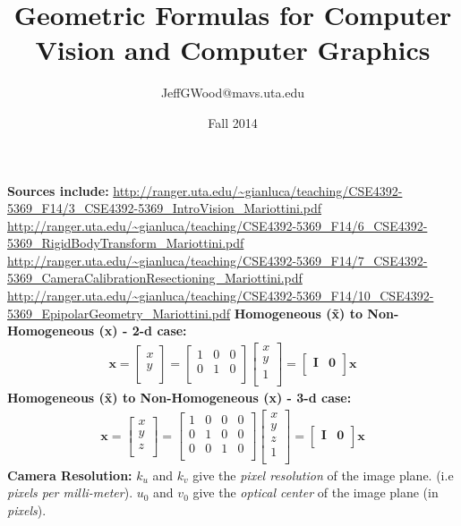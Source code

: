 \documentclass[a4paper,10pt]{article}
\title{Geometric Formulas for Computer Vision and Computer Graphics}
\author{JeffGWood@mavs.uta.edu}
\date{Fall 2014}
\newcommand{\sNHx}{\ensuremath{\textbf{x}}}
\newcommand{\sHx}{\ensuremath{\textbf{\~{x}}}}
\newcommand{\vNHxy}{\ensuremath{\left[\begin{array}{c}x\\y\\\end{array}\right]}}
\newcommand{\vHxy}{\ensuremath{\left[\begin{array}{c}x\\y\\1\\\end{array}\right]}}
\newcommand{\vNHxyz}{\ensuremath{\left[\begin{array}{c}x\\y\\z\\\end{array}\right]}}
\newcommand{\vHxyz}{\ensuremath{\left[\begin{array}{c}x\\y\\z\\1\\\end{array}\right]}}
\newcommand{\mHtoNHtwoD}{\ensuremath{\left[\begin{array}{ccc}1 & 0 & 0\\0 & 1 & 0\\\end{array}\right]}}
\newcommand{\mHtoNHthrD}{\ensuremath{\left[\begin{array}{cccc}1 & 0 & 0 & 0\\0 & 1 & 0 & 0\\0 & 0 & 1 & 0\\\end{array}\right]}}
\newcommand{\mIzero}{\ensuremath{\left[\begin{array}{cc}\textbf{I} & \textbf{0}\\\end{array}\right]}}
\begin{document}
\normalsize
\maketitle
\noindent\newline\noindent
\textbf{Sources include:}\newline
\url{http://ranger.uta.edu/~gianluca/teaching/CSE4392-5369_F14/3_CSE4392-5369_IntroVision_Mariottini.pdf}\newline
\url{http://ranger.uta.edu/~gianluca/teaching/CSE4392-5369_F14/6_CSE4392-5369_RigidBodyTransform_Mariottini.pdf}\newline
\url{http://ranger.uta.edu/~gianluca/teaching/CSE4392-5369_F14/7_CSE4392-5369_CameraCalibrationResectioning_Mariottini.pdf}\newline
\url{http://ranger.uta.edu/~gianluca/teaching/CSE4392-5369_F14/10_CSE4392-5369_EpipolarGeometry_Mariottini.pdf}
\newline\noindent\newline\noindent
\textbf{Homogeneous (\~{x}) to Non-Homogeneous (x) - 2-d case:}
\begin{equation}
\begin{split}
\sNHx = \vNHxy=\mHtoNHtwoD \vHxy=\mIzero \sHx
\end{split}
\end{equation}
\newline\noindent\newline\noindent
\textbf{Homogeneous (\~{x}) to Non-Homogeneous (x) - 3-d case:}
\begin{equation}
\begin{split}
\sNHx =\vNHxyz=\mHtoNHthrD\vHxyz=\mIzero \sHx
\end{split}
\end{equation}
\newline
\textbf{Camera Resolution:}
\newline\noindent\newline\noindent
$k_u$ and $k_v$ give the \textit{pixel resolution} of the image plane. (i.e \textit{pixels per milli-meter}).
$u_0$ and $v_0$ give the \textit{optical center} of the image plane (in \textit{pixels}).
\newline\noindent\newline\noindent
\end{document}
